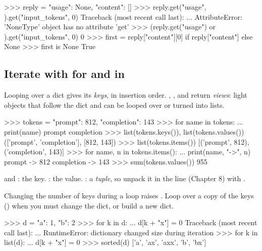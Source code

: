 \begin{pycode}
>>> reply = {"usage": None, "content": []}
>>> reply.get("usage", {}).get("input_tokens", 0)
Traceback (most recent call last):
  ...
AttributeError: 'NoneType' object has no attribute 'get'
>>> (reply.get("usage") or {}).get("input_tokens", 0)
0
>>> first = reply["content"][0] if reply["content"] else None
>>> first is None
True
\end{pycode}

\subsection{Iterate with for and in}

Looping over a dict gives its \emph{keys}, in insertion order. , , and
 return \emph{views}: light objects that follow the dict and can be looped over or
turned into lists.

\begin{pycode}
>>> tokens = {"prompt": 812, "completion": 143}
>>> for name in tokens:
...     print(name)
prompt
completion
>>> list(tokens.keys()), list(tokens.values())
(['prompt', 'completion'], [812, 143])
>>> list(tokens.items())
[('prompt', 812), ('completion', 143)]
>>> for name, n in tokens.items():
...     print(name, "->", n)
prompt -> 812
completion -> 143
>>> sum(tokens.values())
955
\end{pycode}

\begin{typecheck}
 and : the key. : the value.
: a  \emph{tuple}, so unpack it in the  line
(Chapter 8) with .
\end{typecheck}

\begin{trap}
Changing the number of keys during a loop raises . Loop over a copy of the keys
() when you must change the dict, or build a new dict.
\end{trap}

\begin{pycode}
>>> d = {"a": 1, "b": 2}
>>> for k in d:
...     d[k + "x"] = 0
Traceback (most recent call last):
  ...
RuntimeError: dictionary changed size during iteration
>>> for k in list(d):
...     d[k + "x"] = 0
>>> sorted(d)
['a', 'ax', 'axx', 'b', 'bx']
\end{pycode}

